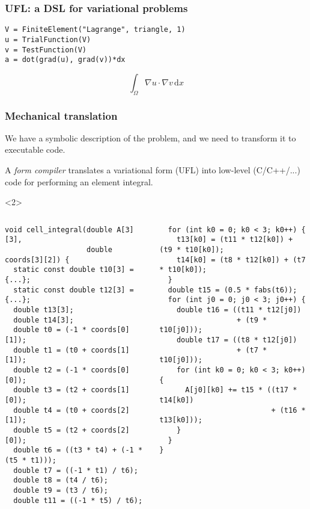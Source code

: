 \documentclass[presentation]{beamer}
\begin{document}
\begin{frame}[fragile]
  \frametitle{UFL: a DSL for variational problems}
\begin{verbatim}
V = FiniteElement("Lagrange", triangle, 1)
u = TrialFunction(V)
v = TestFunction(V)
a = dot(grad(u), grad(v))*dx
\end{verbatim}
  \begin{equation*}
    \int_\Omega \nabla u \cdot \nabla v\,\text{d}x
  \end{equation*}
\end{frame}

\begin{frame}[fragile]
  \frametitle{Mechanical translation}
  We have a symbolic description of the problem, and we need to
  transform it to executable code.

  A \emph{form compiler} translates a variational form (UFL) into
  low-level (C/C++/...) code for performing an element integral.
  \begin{uncoverenv}<2>
    \begin{columns}
      \begin{column}{0.5\textwidth}
\begin{verbatim}
void cell_integral(double A[3][3],
                   double coords[3][2]) {
  static const double t10[3] = {...};
  static const double t12[3] = {...};
  double t13[3];
  double t14[3];
  double t0 = (-1 * coords[0][1]);
  double t1 = (t0 + coords[1][1]);
  double t2 = (-1 * coords[0][0]);
  double t3 = (t2 + coords[1][0]);
  double t4 = (t0 + coords[2][1]);
  double t5 = (t2 + coords[2][0]);
  double t6 = ((t3 * t4) + (-1 * (t5 * t1)));
  double t7 = ((-1 * t1) / t6);
  double t8 = (t4 / t6);
  double t9 = (t3 / t6);
  double t11 = ((-1 * t5) / t6);
\end{verbatim}
      \end{column}
      \begin{column}{0.5\textwidth}
\begin{verbatim}
  for (int k0 = 0; k0 < 3; k0++) {
    t13[k0] = (t11 * t12[k0]) + (t9 * t10[k0]);
    t14[k0] = (t8 * t12[k0]) + (t7 * t10[k0]);
  }
  double t15 = (0.5 * fabs(t6));
  for (int j0 = 0; j0 < 3; j0++) {
    double t16 = ((t11 * t12[j0])
                  + (t9 * t10[j0]));
    double t17 = ((t8 * t12[j0])
                  + (t7 * t10[j0]));
    for (int k0 = 0; k0 < 3; k0++) {
      A[j0][k0] += t15 * ((t17 * t14[k0])
                          + (t16 * t13[k0]));
    }
  }
}
\end{verbatim}
      \end{column}
    \end{columns}
  \end{uncoverenv}
\end{frame}
\end{document}
